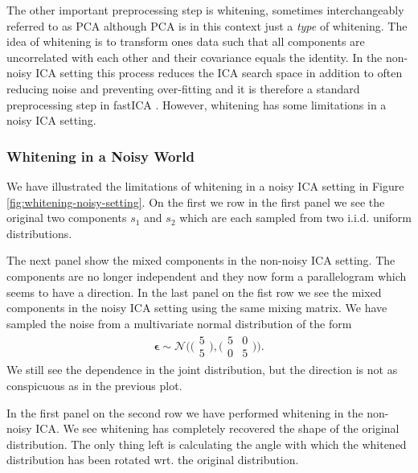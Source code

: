 		The other important preprocessing step is whitening, sometimes interchangeably referred to as PCA although PCA is in this context just a \textit{type} of whitening. The idea of whitening is to transform ones data such that all components are uncorrelated with each other and their covariance equals the identity. In the non-noisy ICA setting this process reduces the ICA search space in addition to often reducing noise and preventing over-fitting and it is therefore a standard preprocessing step in fastICA \cite[p.12]{hyvarinen2000}. However, whitening has some limitations in a noisy ICA setting.

		\subsubsection{Whitening in a Noisy World}

			We have illustrated the limitations of whitening in a noisy ICA setting in Figure \ref{fig:whitening-noisy-setting}. On the first we row in the first panel we see the original two components $s_1$ and $s_2$ which are each sampled from two i.i.d. uniform distributions. 

			The next panel show the mixed components in the non-noisy ICA setting. The components are no longer independent and they now form a parallelogram which seems to have a direction. In the last panel on the fist row we see the mixed components in the noisy ICA setting using the same mixing matrix. We have sampled the noise from a multivariate normal distribution of the form
				\begin{align*}
					\bm{\epsilon} \sim \mathcal{N}\bigg(\bigg(\begin{array}{c}  5 \\ 5 \end{array}\bigg),\bigg(\begin{array}{cc}  5 & 0 \\ 0 & 5 \end{array}\bigg)\bigg).
				\end{align*} 
			We still see the dependence in the joint distribution, but the direction is not as conspicuous as in the previous plot. 

			In the first panel on the second row we have performed whitening in the non-noisy ICA. We see whitening has completely recovered the shape of the original distribution. The only thing left is calculating the angle with which the whitened distribution has been rotated wrt. the original distribution.

